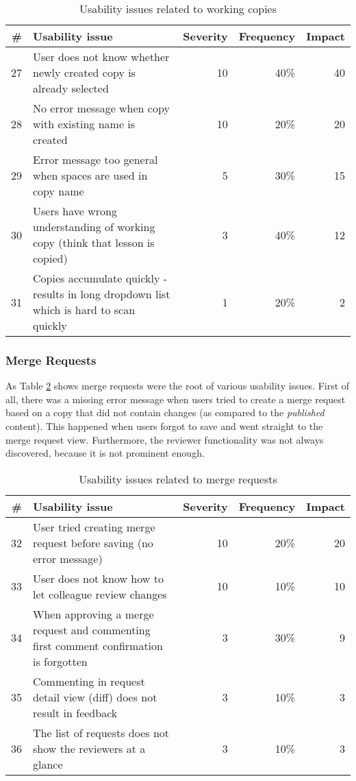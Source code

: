 
\begin{table}[h!]
\centering
\begin{tabular}{|r|p{7cm}|r|r|r|}
\hline
\rowcolor[HTML]{EFEFEF}
{\bf \#} & {\bf Usability issue} & {\bf Severity} & {\bf Frequency} & {\bf Impact} \\ \hline
27 & User does not know whether newly created copy is already selected & 10 & 40\% & 40 \\ \hline
28 & No error message when copy with existing name is created & 10 & 20\% & 20 \\ \hline
29 & Error message too general when spaces are used in copy name & 5 & 30\% & 15 \\ \hline
30 & Users have wrong understanding of working copy (think that lesson is copied) & 3 & 40\% & 12 \\ \hline
31 & Copies accumulate quickly - results in long dropdown list which is hard to scan quickly & 1 & 20\% & 2 \\ \hline
\end{tabular}
\caption{Usability issues related to working copies}
\label{table:issues-copies}
\end{table}

\subsubsection{Merge Requests}
As Table \ref{table:issues-merge} shows merge requests were the root of various usability issues. First of all, there was a missing error message when users tried to create a merge request based on a copy that did not contain changes (as compared to the \textit{published} content). This happened when users forgot to save and went straight to the merge request view. Furthermore, the reviewer functionality was not always discovered, because it is not prominent enough.

\begin{table}[h!]
\centering
\begin{tabular}{|r|p{7cm}|r|r|r|}
\hline
\rowcolor[HTML]{EFEFEF}
{\bf \#} & {\bf Usability issue} & {\bf Severity} & {\bf Frequency} & {\bf Impact} \\ \hline
32 & User tried creating merge request before saving (no error message) & 10 & 20\% & 20 \\ \hline
33 & User does not know how to let colleague review changes & 10 & 10\% & 10 \\ \hline
34 & When approving a merge request and commenting first comment confirmation is forgotten & 3 & 30\% & 9 \\ \hline
35 & Commenting in request detail view (diff) does not result in feedback & 3 & 10\% & 3 \\ \hline
36 & The list of requests does not show the reviewers at a glance & 3 & 10\% & 3 \\ \hline
\end{tabular}
\caption{Usability issues related to merge requests}
\label{table:issues-merge}
\end{table}

